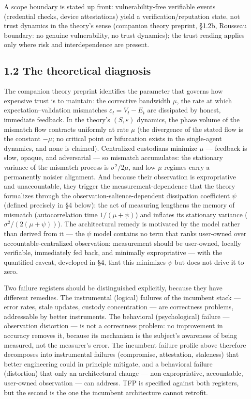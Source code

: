 \documentclass[
]{article}
\newcounter{none} %
\begin{document}
A scope boundary is stated up front: vulnerability-free verifiable
events (credential checks, device attestations) yield a
verification/reputation state, not trust dynamics in the theory's sense
(companion theory preprint, §1.2b, Rousseau boundary: no genuine
vulnerability, no trust dynamics); the trust reading applies only where
risk and interdependence are present.

\subsection{1.2 The theoretical
diagnosis}\label{the-theoretical-diagnosis}

The companion theory preprint identifies the parameter that governs how
expensive trust is to maintain: the corrective bandwidth \(\mu\), the
rate at which expectation--validation mismatches
\(\varepsilon_t = V_t - E_t\) are dissipated by honest, immediate
feedback. In the theory's \((S, \varepsilon)\) dynamics, the phase
volume of the mismatch flow contracts uniformly at rate \(\mu\) (the
divergence of the stated flow is the constant \(-\mu\); no critical
point or bifurcation exists in the single-agent dynamics, and none is
claimed). Centralized custodians minimize \(\mu\) --- feedback is slow,
opaque, and adversarial --- so mismatch accumulates: the stationary
variance of the mismatch process is \(\sigma^2/2\mu\), and low-\(\mu\)
regimes carry a permanently noisier alignment. And because their
observation is expropriative and unaccountable, they trigger the
measurement-dependence that the theory formalizes through the
observation-salience-dependent dissipation coefficient \(\psi\) (defined
precisely in §4 below): the act of measuring lengthens the memory of
mismatch (autocorrelation time \(1/(\mu+\psi)\)) and inflates its
stationary variance (\(\sigma^2/(2(\mu+\psi))\)). The architectural
remedy is motivated by the model rather than derived from it --- the
\(\psi\) model contains no term that ranks user-owned over
accountable-centralized observation: measurement should be user-owned,
locally verifiable, immediately fed back, and minimally expropriative
--- with the quantified caveat, developed in §4, that this minimizes
\(\psi\) but does not drive it to zero.

Two failure registers should be distinguished explicitly, because they
have different remedies. The instrumental (logical) failures of the
incumbent stack --- error rates, stale updates, custody concentration
--- are correctness problems, addressable by better instruments. The
behavioral (psychological) failure --- observation distortion --- is not
a correctness problem: no improvement in accuracy removes it, because
its mechanism is the subject's awareness of being measured, not the
measurer's error. The incumbent failure profile above therefore
decomposes into instrumental failures (compromise, attestation,
staleness) that better engineering could in principle mitigate, and a
behavioral failure (distortion) that only an architectural change ---
non-expropriative, accountable, user-owned observation --- can address.
TFP is specified against both registers, but the second is the one the
incumbent architecture cannot retrofit.
\end{document}
